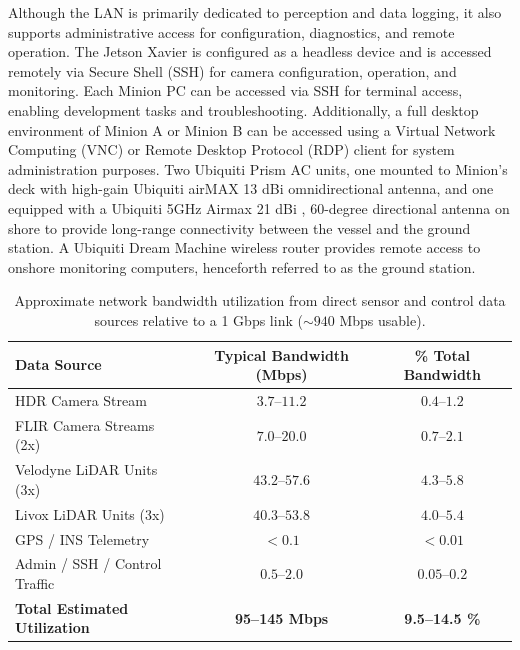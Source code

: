 \documentclass{erauthesis}
\begin{document}
Although the LAN is primarily dedicated to perception and data logging, it also supports administrative access for configuration, diagnostics, and remote operation.
The Jetson Xavier is configured as a headless device and is accessed remotely via Secure Shell (SSH) for camera configuration, operation, and monitoring.
Each Minion PC can be accessed via SSH for terminal access, enabling development tasks and troubleshooting.
Additionally, a full desktop environment  of Minion A or Minion B can be accessed using a Virtual Network Computing (VNC) or Remote Desktop Protocol (RDP) client for system administration purposes.
Two Ubiquiti Prism AC units, one mounted to Minion's deck with high-gain Ubiquiti airMAX 13 dBi omnidirectional antenna, and one equipped with a Ubiquiti 5GHz Airmax 21 dBi ,  60-degree directional antenna on shore to provide long-range connectivity between the vessel and the ground station. A Ubiquiti Dream Machine wireless router provides remote access to onshore monitoring computers, henceforth referred to as the ground station. 


\begin{table}[htbp]
\centering
\begin{tabular}{lcc}
\hline
Data Source & Typical Bandwidth (Mbps) & \% Total Bandwidth \\
\hline
\hline
HDR Camera Stream & $3.7$--$11.2$ & $0.4$--$1.2$ \\
FLIR Camera Streams (2x) & $7.0$--$20.0$ & $0.7$--$2.1$ \\
Velodyne LiDAR Units (3x) & $43.2$--$57.6$ & $4.3$--$5.8$ \\
Livox LiDAR Units (3x) & $40.3$--$53.8$ & $4.0$--$5.4$ \\
GPS / INS Telemetry & $<0.1$ & $<0.01$ \\
Admin / SSH / Control Traffic & $0.5$--$2.0$ & $0.05$--$0.2$ \\
\hline
\textbf{Total Estimated Utilization} & \textbf{95--145 Mbps} & \textbf{9.5--14.5 \%} \\
\end{tabular}
\caption{Approximate network bandwidth utilization from direct sensor and control data sources relative to a 1 Gbps link ($\sim940$ Mbps usable).}
\label{table:network_bandwidth}
\end{table}
\end{document}
